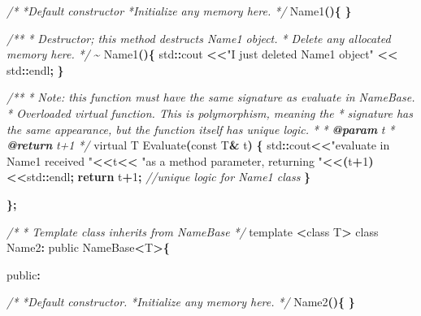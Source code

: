 \documentclass[
]{book}
\newenvironment{Shaded}{\begin{snugshade}}{\end{snugshade}}
\newcommand{\AnnotationTok}[1]{\textcolor[rgb]{0.56,0.35,0.01}{\textbf{\textit{#1}}}}
\newcommand{\CommentTok}[1]{\textcolor[rgb]{0.56,0.35,0.01}{\textit{#1}}}
\newcommand{\ControlFlowTok}[1]{\textcolor[rgb]{0.13,0.29,0.53}{\textbf{#1}}}
\newcommand{\DataTypeTok}[1]{\textcolor[rgb]{0.13,0.29,0.53}{#1}}
\newcommand{\DecValTok}[1]{\textcolor[rgb]{0.00,0.00,0.81}{#1}}
\newcommand{\NormalTok}[1]{#1}
\newcommand{\OperatorTok}[1]{\textcolor[rgb]{0.81,0.36,0.00}{\textbf{#1}}}
\newcommand{\StringTok}[1]{\textcolor[rgb]{0.31,0.60,0.02}{#1}}
\begin{document}
\begin{Shaded}
\begin{Highlighting}[]
    
  \CommentTok{/*}
\CommentTok{   *Default constructor}
\CommentTok{   *Initialize any memory here.}
\CommentTok{   */}
\NormalTok{  Name1}\OperatorTok{()\{}
  \OperatorTok{\}}
  
 
  \CommentTok{/**}
\CommentTok{   * Destructor; this method destructs Name1 object.}
\CommentTok{   * Delete any allocated memory here.}
\CommentTok{   */}
  \OperatorTok{\textasciitilde{}}\NormalTok{ Name1}\OperatorTok{()\{}
\NormalTok{    std}\OperatorTok{::}\NormalTok{cout }\OperatorTok{\textless{}\textless{}}\StringTok{"I just deleted Name1 object"} \OperatorTok{\textless{}\textless{}}\NormalTok{ std}\OperatorTok{::}\NormalTok{endl}\OperatorTok{;}
  \OperatorTok{\}}
  
   \CommentTok{/**}
\CommentTok{    * Note: this function must have the same signature as evaluate in NameBase.}
\CommentTok{    * Overloaded virtual function. This is polymorphism, meaning the }
\CommentTok{    * signature has the same appearance, but the function itself has unique logic.}
\CommentTok{    * }
\CommentTok{    * }\AnnotationTok{@param}\CommentTok{ t}
\CommentTok{    * }\AnnotationTok{@return}\CommentTok{ t+1}
\CommentTok{    */}
\NormalTok{   virtual T Evaluate}\OperatorTok{(}\DataTypeTok{const}\NormalTok{ T}\OperatorTok{\&}\NormalTok{ t}\OperatorTok{)} \OperatorTok{\{}
\NormalTok{     std}\OperatorTok{::}\NormalTok{cout}\OperatorTok{\textless{}\textless{}}\StringTok{"evaluate in Name1 received "}\OperatorTok{\textless{}\textless{}}\NormalTok{t}\OperatorTok{\textless{}\textless{}}
     \StringTok{"as a method parameter, returning "}\OperatorTok{\textless{}\textless{}(}\NormalTok{t}\OperatorTok{+}\DecValTok{1}\OperatorTok{)\textless{}\textless{}}\NormalTok{std}\OperatorTok{::}\NormalTok{endl}\OperatorTok{;}
     \ControlFlowTok{return}\NormalTok{ t}\OperatorTok{+}\DecValTok{1}\OperatorTok{;} \CommentTok{//unique logic for Name1 class}
   \OperatorTok{\}}

\OperatorTok{\};}

  \CommentTok{/* }
\CommentTok{* Template class inherits from  NameBase}
\CommentTok{*/}
\NormalTok{template }\OperatorTok{\textless{}}\NormalTok{class T}\OperatorTok{\textgreater{}}
\NormalTok{class Name2}\OperatorTok{:}\NormalTok{ public NameBase}\OperatorTok{\textless{}}\NormalTok{T}\OperatorTok{\textgreater{}\{}

\NormalTok{public}\OperatorTok{:}
 
    
  \CommentTok{/*}
\CommentTok{   *Default constructor.}
\CommentTok{   *Initialize any memory here.}
\CommentTok{   */}
\NormalTok{  Name2}\OperatorTok{()\{}
  \OperatorTok{\}}
  

\end{Highlighting}
\end{Shaded}
\end{document}
